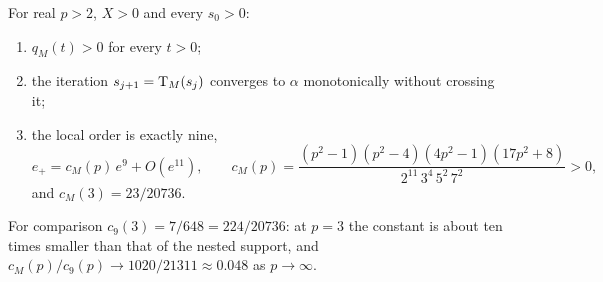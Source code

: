 \begin{theorem}\label{thm:mean}
For real $p>2$, $X>0$ and every $s_0>0$:
\begin{enumerate}[label=\textup{(\roman*)}]
\item $q_M(t)>0$ for every $t>0$;
\item the iteration $s_{j+1}=\mathrm{T}_M(s_j)$ converges to $\alpha$ monotonically without crossing it;
\item the local order is exactly nine,
\begin{equation}\label{eq:cM}
e_+=c_M(p)\,e^{9}+O(e^{11}),\qquad
c_M(p)=\frac{(p^{2}-1)(p^{2}-4)(4p^{2}-1)(17p^{2}+8)}{2^{11}\,3^{4}\,5^{2}\,7^{2}}>0 ,
\end{equation}
and $c_M(3)=23/20736$.
\end{enumerate}
\end{theorem}

For comparison $c_9(3)=7/648=224/20736$: at $p=3$ the constant is about ten times smaller than that of
the nested support, and $c_M(p)/c_9(p)\to1020/21311\approx0.048$ as $p\to\infty$.

